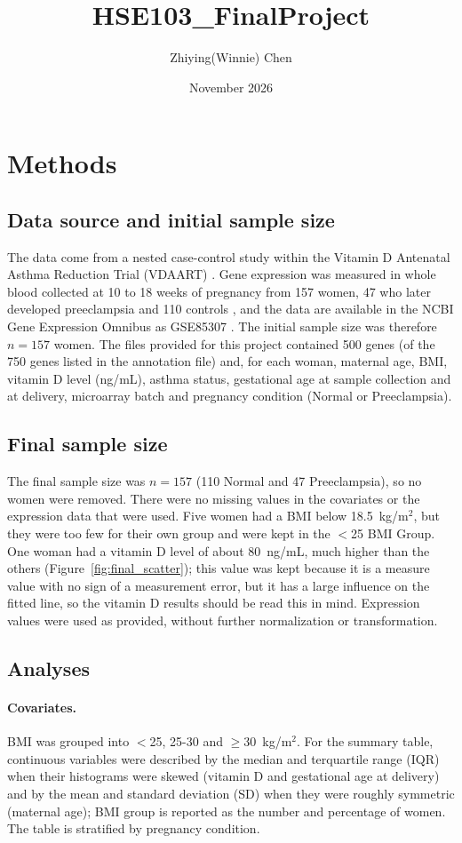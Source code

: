 \documentclass{article}
\title{HSE103_FinalProject}
\author{Zhiying(Winnie) Chen}
\date{November 2026}
\begin{document}
\maketitle
\section{Methods}

\subsection{Data source and initial sample size}
The data come from a nested case-control study within the Vitamin D Antenatal Asthma
Reduction Trial (VDAART) \citep{Mirzakhani2016}. Gene expression was measured in whole
blood collected at 10 to 18 weeks of pregnancy from 157 women, 47 who later developed
preeclampsia and 110 controls \citep{Mirzakhani2016}, and the data are available in the
NCBI Gene Expression Omnibus as GSE85307 \citep{GSE85307}. The initial sample size was
therefore $n = 157$ women. The files provided for this project contained 500 genes (of
the 750 genes listed in the annotation file) and, for each woman, maternal age, BMI,
vitamin D level (ng/mL), asthma status, gestational age at sample collection and at
delivery, microarray batch and pregnancy condition (Normal or Preeclampsia).

\subsection{Final sample size}
The final sample size was $n = 157$ (110 Normal and 47 Preeclampsia), so no women were removed. There were no missing values in the covariates or the expression data that were used. Five women had a BMI below 18.5~kg/m$^2$, but they were too few for their own group and were kept in the $<$25 BMI Group. One woman had a vitamin D level of about 80~ng/mL, much higher than the others (Figure~\ref{fig:final_scatter}); this value was kept because it is a measure value with no sign of a measurement error, but it has a large influence on the fitted line, so the vitamin D results should be read this in mind. Expression values were used as provided, without further normalization or transformation.

\subsection{Analyses}
\paragraph{Covariates.}BMI was grouped into $<$25, 25-30 and $\geq$30~kg/m$^2$. For the summary table, continuous variables were described by the median and terquartile range (IQR) when their histograms were skewed (vitamin D and gestational age at delivery) and by the mean and standard deviation (SD) when they were roughly symmetric (maternal age); BMI group is reported as the number and percentage of women.
The table is stratified by pregnancy condition.
\end{document}
